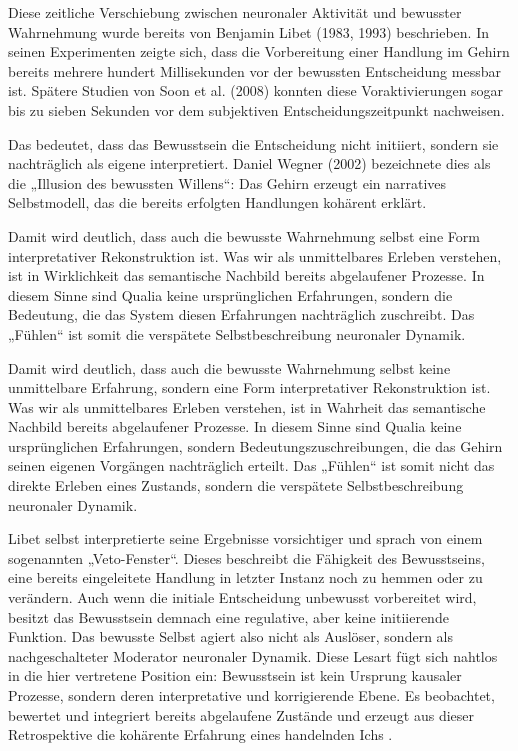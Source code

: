 Diese zeitliche Verschiebung zwischen neuronaler Aktivität und bewusster Wahrnehmung wurde bereits von Benjamin Libet (1983, 1993) beschrieben. In seinen Experimenten zeigte sich, dass die Vorbereitung einer Handlung im Gehirn bereits mehrere hundert Millisekunden vor der bewussten Entscheidung messbar ist. Spätere Studien von Soon et al. (2008) konnten diese Voraktivierungen sogar bis zu sieben Sekunden vor dem subjektiven Entscheidungszeitpunkt nachweisen.

Das bedeutet, dass das Bewusstsein die Entscheidung nicht initiiert, sondern sie nachträglich als eigene interpretiert. Daniel Wegner (2002) bezeichnete dies als die „Illusion des bewussten Willens“: Das Gehirn erzeugt ein narratives Selbstmodell, das die bereits erfolgten Handlungen kohärent erklärt.

Damit wird deutlich, dass auch die bewusste Wahrnehmung selbst eine Form interpretativer Rekonstruktion ist. Was wir als unmittelbares Erleben verstehen, ist in Wirklichkeit das semantische Nachbild bereits abgelaufener Prozesse. In diesem Sinne sind Qualia keine ursprünglichen Erfahrungen, sondern die Bedeutung, die das System diesen Erfahrungen nachträglich zuschreibt. Das „Fühlen“ ist somit die verspätete Selbstbeschreibung neuronaler Dynamik.

Damit wird deutlich, dass auch die bewusste Wahrnehmung selbst keine unmittelbare Erfahrung, sondern eine Form interpretativer Rekonstruktion ist. Was wir als unmittelbares Erleben verstehen, ist in Wahrheit das semantische Nachbild bereits abgelaufener Prozesse. In diesem Sinne sind Qualia keine ursprünglichen Erfahrungen, sondern Bedeutungszuschreibungen, die das Gehirn seinen eigenen Vorgängen nachträglich erteilt. Das „Fühlen“ ist somit nicht das direkte Erleben eines Zustands, sondern die verspätete Selbstbeschreibung neuronaler Dynamik.

Libet selbst interpretierte seine Ergebnisse vorsichtiger und sprach von einem sogenannten „Veto-Fenster“. Dieses beschreibt die Fähigkeit des Bewusstseins, eine bereits eingeleitete Handlung in letzter Instanz noch zu hemmen oder zu verändern. Auch wenn die initiale Entscheidung unbewusst vorbereitet wird, besitzt das Bewusstsein demnach eine regulative, aber keine initiierende Funktion. Das bewusste Selbst agiert also nicht als Auslöser, sondern als nachgeschalteter Moderator neuronaler Dynamik. Diese Lesart fügt sich nahtlos in die hier vertretene Position ein: Bewusstsein ist kein Ursprung kausaler Prozesse, sondern deren interpretative und korrigierende Ebene. Es beobachtet, bewertet und integriert bereits abgelaufene Zustände und erzeugt aus dieser Retrospektive die kohärente Erfahrung eines handelnden Ichs \cite{Libet1993,Wegner2002,Soon2008}.

